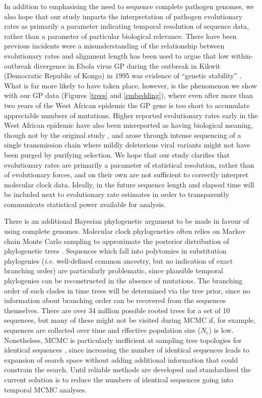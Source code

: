 \documentclass{bmcart}
\begin{document}
In addition to emphasising the need to sequence complete pathogen genomes, we also hope that our study imparts the interpretation of pathogen evolutionary rates as primarily a parameter indicating temporal resolution of sequence data, rather than a parameter of particular biological relevance.
There have been previous incidents were a misunderstanding of the relationship between evolutionary rates and alignment length has been used to argue that low within-outbreak divergence in Ebola virus GP during the outbreak in Kikwit (Democratic Republic of Kongo) in 1995 was evidence of ``genetic stability'' \cite{rodriguez_persistence_1999}.
What is far more likely to have taken place, however, is the phenomenon we show with our GP data (Figures \ref{trees} and \ref{embedding}), where even after more than two years of the West African epidemic the GP gene is too short to accumulate appreciable numbers of mutations.
Higher reported evolutionary rates early in the West African epidemic \cite{gire_genomic_2014} have also been misreported as having biological meaning, though not by the original study \cite{holmes_evolution_2016,rambaut_comment_2016}, and arose through intense sequencing of a single transmission chain where mildly deleterious viral variants might not have been purged by purifying selection.
We hope that our study clarifies that evolutionary rates are primarily a parameter of statistical resolution, rather than of evolutionary forces, and on their own are not sufficient to correctly interpret molecular clock data.
Ideally, in the future sequence length and elapsed time will be included next to evolutionary rate estimates in order to transparently communicate statistical power available for analysis.

There is an additional Bayesian phylogenetic argument to be made in favour of using complete genomes.
Molecular clock phylogenetics often relies on Markov chain Monte Carlo sampling to approximate the posterior distribution of phylogenetic trees \cite{yang_bayesian_1997}.
Sequences which fall into polytomies in substitution phylogenies (\textit{i.e.} well-defined common ancestry, but no indication of exact branching order) are particularly problematic, since plausible temporal phylogenies can be reconstructed in the absence of mutations.
The branching order of such clades in time trees will be determined via the tree prior, since no information about branching order can be recovered from the sequences themselves.
There are over 34 million possible rooted trees for a set of 10 sequences, but many of these might not be visited during MCMC if, for example, sequences are collected over time and effective population size ($N_{e}$) is low.
Nonetheless, MCMC is particularly inefficient at sampling tree topologies for identical sequences \cite{whidden_quantifying_2015}, since increasing the number of identical sequences leads to expansion of search space without adding additional information that could constrain the search.
Until reliable methods are developed and standardised the current solution is to reduce the numbers of identical sequences going into temporal MCMC analyses.
\end{document}
